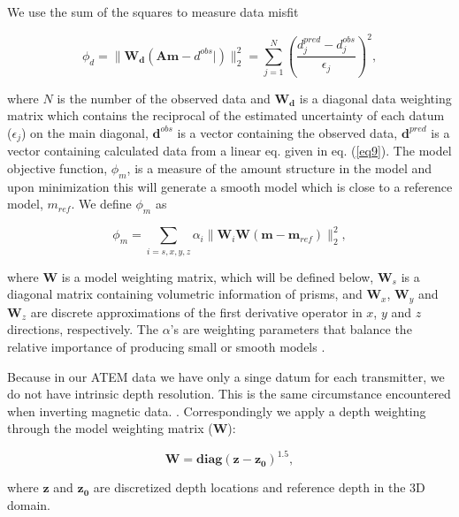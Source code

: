 \documentclass[extra,mreferee]{gji}
\begin{document}
We use the sum of the squares to measure data misfit
\begin{linenomath*}
\begin{equation}
  \phi_d = \| \mathbf{W_d}(\mathbf{A}\mathbf{m}-d^{obs}|)\|^2_2 =
  \sum^N_{j=1}(\frac{d^{pred}_j-d^{obs}_j}{\epsilon_j})^2,
  \label{eq11}
\end{equation}
\end{linenomath*}
where $N$ is the number of the observed data and $\mathbf{W_d}$ is a diagonal data weighting matrix which contains the reciprocal of the estimated uncertainty of each datum ($\epsilon_j$) on the main diagonal,  $\mathbf{d}^{obs}$ is a vector containing the observed data, $\mathbf{d}^{pred}$ is a vector containing calculated data from a linear eq. given in eq. (\ref{eq9}).
The model objective function, $\phi_m$, is a measure of the amount structure in the model and upon minimization this will generate a smooth model which is close to a reference model, $m_{ref}$. 
We define $\phi_m$ as
\begin{linenomath*}
\begin{equation}
  \phi_m = \sum_{i=s,x,y,z} \alpha_i\| \mathbf{W}_i\mathbf{W}(\mathbf{m}-\mathbf{m}_{ref})\|^2_2,
  \label{eq12}
\end{equation}
\end{linenomath*}
where $\mathbf{W}$ is a model weighting matrix, which will be defined below, $\mathbf{W}_s$ is a diagonal matrix containing volumetric information of prisms, and $\mathbf{W}_x$, $\mathbf{W}_y$ and $\mathbf{W}_z$ are discrete approximations of the first derivative operator in $x$, $y$ and $z$ directions, respectively.  
The $\alpha$'s are weighting parameters that balance the relative importance of producing small or smooth models \cite[]{TikhonovA.N.1977}.

Because in our ATEM data we have only a singe datum for each transmitter, we do not have intrinsic depth resolution. 
This is the same circumstance encountered when inverting magnetic data. \cite[]{LiMag3D}. Correspondingly we apply a depth weighting through the model weighting matrix ($\mathbf{W}$):
\begin{linenomath*}
\begin{equation}
    \mathbf{W} = \mathbf{diag}(\mathbf{z-z_0})^{1.5},
    \label{eq: weight_mat}
\end{equation}
\end{linenomath*}
where $\mathbf{z}$ and $\mathbf{z_0}$ are discretized depth locations and reference depth in the 3D domain.
\end{document}
